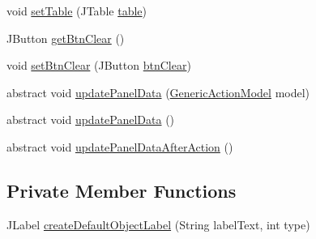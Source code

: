 \begin{DoxyCompactItemize}
\item 
void \hyperlink{classcom_1_1poly_1_1nlp_1_1filekommander_1_1views_1_1panels_1_1_abstract_message_panel_ae66c31b95e8c1fe4d28565e7dcaf9a91}{set\-Table} (J\-Table \hyperlink{classcom_1_1poly_1_1nlp_1_1filekommander_1_1views_1_1panels_1_1_abstract_message_panel_ab00e095308fb951695dc4fefe0d86cb3}{table})
\item 
J\-Button \hyperlink{classcom_1_1poly_1_1nlp_1_1filekommander_1_1views_1_1panels_1_1_abstract_message_panel_ab88a15cf8a7d5f3a3266342841b8ea13}{get\-Btn\-Clear} ()
\item 
void \hyperlink{classcom_1_1poly_1_1nlp_1_1filekommander_1_1views_1_1panels_1_1_abstract_message_panel_ad2c1bd073c20d8e9dfcd1bdf0b2f27ba}{set\-Btn\-Clear} (J\-Button \hyperlink{classcom_1_1poly_1_1nlp_1_1filekommander_1_1views_1_1panels_1_1_abstract_message_panel_af85293e132ba96e5c707b39c418260c3}{btn\-Clear})
\item 
abstract void \hyperlink{classcom_1_1poly_1_1nlp_1_1filekommander_1_1views_1_1panels_1_1_abstract_message_panel_a9e5c061f76725ea2cbc6db991e1e4968}{update\-Panel\-Data} (\hyperlink{interfacecom_1_1poly_1_1nlp_1_1filekommander_1_1views_1_1models_1_1_generic_action_model}{Generic\-Action\-Model} model)
\item 
abstract void \hyperlink{classcom_1_1poly_1_1nlp_1_1filekommander_1_1views_1_1panels_1_1_abstract_message_panel_a1c0fcce6b9a3e540c8985c69bea60cd3}{update\-Panel\-Data} ()
\item 
abstract void \hyperlink{classcom_1_1poly_1_1nlp_1_1filekommander_1_1views_1_1panels_1_1_abstract_message_panel_a305ad7e0b41448b92cfc567062fbb874}{update\-Panel\-Data\-After\-Action} ()
\end{DoxyCompactItemize}
\subsection*{Private Member Functions}
\begin{DoxyCompactItemize}
\item 
J\-Label \hyperlink{classcom_1_1poly_1_1nlp_1_1filekommander_1_1views_1_1panels_1_1_abstract_message_panel_a623b9852884a79f9db920f3e3444ac47}{create\-Default\-Object\-Label} (String label\-Text, int type)
\end{DoxyCompactItemize}
